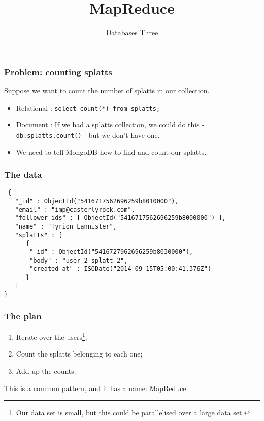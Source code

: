 \documentclass[10pt]{beamer}
\title{MapReduce}
\author[IN705]{Databases Three}
\institute[Otago Polytechnic]{
  Otago Polytechnic \\
  Dunedin, New Zealand \\
}
\date{}
\begin{document}
\begin{frame}[plain]
  \titlepage
\end{frame}



\begin{frame}
  \frametitle{Problem: counting splatts}
 Suppose we want to count the number of splatts in our collection.
 \begin{itemize}
	 \item Relational : \texttt{select count(*) from splatts;}
	 \item Document : If we had a splatts collection, we could
		 do this - \texttt{db.splatts.count()}  - but
		 we don't have one.
	 \item We need to tell MongoDB how to find and count our
		 splatts.
		
 \end{itemize}

\end{frame}



\begin{frame}[fragile]
  \frametitle{The data}

 \begin{verbatim}
 {
   "_id" : ObjectId("5416717562696259b8010000"),
   "email" : "imp@casterlyrock.com",
   "follower_ids" : [ ObjectId("5416717562696259b8000000") ],
   "name" : "Tyrion Lannister",
   "splatts" : [
      {
       "_id" : ObjectId("5416727962696259b8030000"),
       "body" : "user 2 splatt 2",
       "created_at" : ISODate("2014-09-15T05:00:41.376Z")
      } 
   ] 
}

 \end{verbatim}

\end{frame}


\begin{frame}
  \frametitle{The plan}

 \begin{enumerate}
  \item Iterate over the users\footnote{Our data set is small, but this could be parallelised over
	  a large data set.};
  \item Count the splatts belonging to each one;
  \item Add up the counts.
 \end{enumerate}

 This is a common pattern, and it has a name: MapReduce.
\end{frame}
\end{document}
